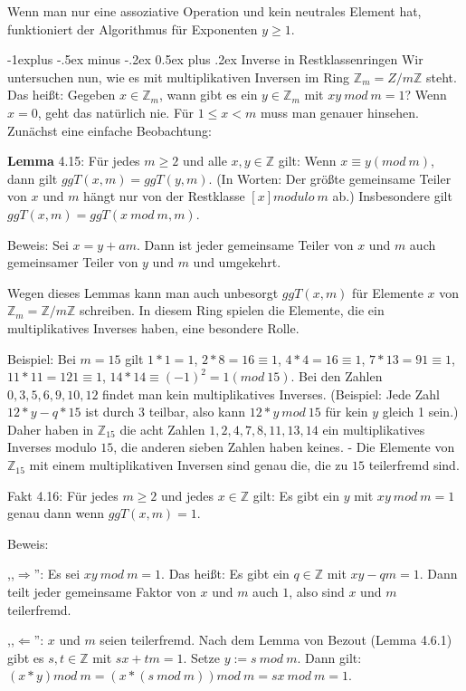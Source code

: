 \documentclass[a4paper]{article}
\makeatletter
\renewcommand{\subsection}{\@startsection{subsection}{2}{0mm}%
 {-1explus -.5ex minus -.2ex}%
 {0.5ex plus .2ex}%
 {\normalfont\normalsize\bfseries}}
\makeatother
\begin{document}
\begin{multicols}{3}
    Wenn man nur eine assoziative Operation und kein neutrales Element hat, funktioniert der Algorithmus für Exponenten $y\geq 1$.

    \subsection{Inverse in Restklassenringen}
    Wir untersuchen nun, wie es mit multiplikativen Inversen im Ring $\mathbb{Z}_m =Z/m\mathbb{Z}$ steht. Das heißt: Gegeben $x\in\mathbb{Z}_m$, wann gibt es ein $y\in\mathbb{Z}_m$ mit $xy\ mod\ m= 1$? Wenn $x=0$, geht das natürlich nie. Für $1\leq x<m$ muss man genauer hinsehen.
    Zunächst eine einfache Beobachtung:

    \textbf{Lemma} 4.15: Für jedes $m\geq 2$ und alle $x,y\in\mathbb{Z}$ gilt: Wenn $x\equiv y(mod\ m)$, dann gilt $ggT(x,m)=ggT(y,m)$. (In Worten: Der größte gemeinsame Teiler von $x$ und $m$ hängt nur von der Restklasse $[x] modulo\ m$ ab.) Insbesondere gilt $ggT(x,m) = ggT(x\ mod\ m,m)$.

    Beweis: Sei $x=y+am$. Dann ist jeder gemeinsame Teiler von $x$ und $m$ auch gemeinsamer Teiler von $y$ und $m$ und umgekehrt.

    Wegen dieses Lemmas kann man auch unbesorgt $ggT(x,m)$ für Elemente $x$ von $\mathbb{Z}_m =\mathbb{Z}/m\mathbb{Z}$ schreiben. In diesem Ring spielen die Elemente, die ein multiplikatives Inverses haben, eine besondere Rolle.

    Beispiel: Bei $m=15$ gilt $1*1=1$, $2*8 = 16\equiv 1$, $4*4 = 16\equiv 1$, $7*13 = 91\equiv 1$, $11*11 = 121\equiv 1$, $14* 14 \equiv (-1)^2 = 1 (mod\ 15)$. Bei den Zahlen $0, 3 , 5 , 6 , 9 , 10 , 12$ findet man kein multiplikatives Inverses. (Beispiel: Jede Zahl $12*y-q*15$ ist durch $3$ teilbar, also kann $12*y\ mod\ 15$ für kein $y$ gleich 1 sein.) Daher haben in $\mathbb{Z}_{15}$ die acht Zahlen $1, 2, 4, 7, 8, 11, 13, 14$ ein multiplikatives Inverses modulo $15$, die anderen sieben Zahlen haben keines. - Die Elemente von $\mathbb{Z}_{15}$ mit einem multiplikativen Inversen sind genau die, die zu $15$ teilerfremd sind.

    Fakt 4.16: Für jedes $m\geq 2$ und jedes $x\in\mathbb{Z}$ gilt: Es gibt ein $y$ mit $xy\ mod\ m=1$ genau dann wenn $ggT(x,m)=1$.

    Beweis:
    \begin{itemize*}
        \item ,,$\Rightarrow$'': Es sei $xy\ mod\ m= 1$. Das heißt: Es gibt ein $q\in\mathbb{Z}$ mit $xy-qm=1$. Dann teilt jeder gemeinsame Faktor von $x$ und $m$ auch $1$, also sind $x$ und $m$ teilerfremd.
        \item ,,$\Leftarrow$'': $x$ und $m$ seien teilerfremd. Nach dem Lemma von Bezout (Lemma 4.6.1) gibt es $s,t\in\mathbb{Z}$ mit $sx+tm=1$. Setze $y:=s\ mod\ m$. Dann gilt: $(x*y) mod\ m= (x*(s\ mod\ m)) mod\ m=sx\ mod\ m= 1$.
    \end{itemize*}


\end{multicols}
\end{document}
